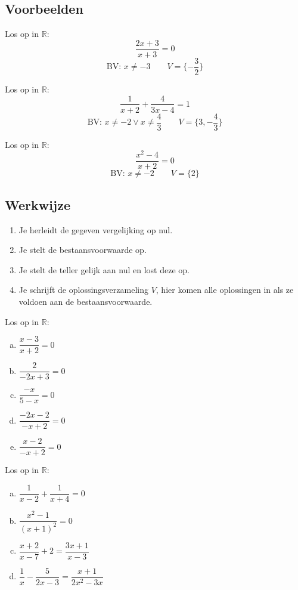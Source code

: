 \documentclass[12pt]{article}
\begin{document}
\subsection{Voorbeelden}

Los op in $\mathbb{R}$:
$$\frac{2x+3}{x+3} = 0$$
$$\mbox{BV: }x\neq -3 \qquad V=\{-\dfrac{3}{2}\}$$


Los op in $\mathbb{R}$:
$$\frac{1}{x+2}+\frac{4}{3x-4}=1$$
$$\mbox{BV: }x\neq -2 \vee x\neq \dfrac{4}{3} \qquad V=\{3,-\dfrac{4}{3}\}$$

Los op in $\mathbb{R}$:
$$\frac{x^2-4}{x+2}=0$$
$$\mbox{BV: }x\neq -2 \qquad V=\{2\}$$

\subsection{Werkwijze}
\begin{enumerate}[(1)]
  \item Je herleidt de gegeven vergelijking op nul.
  \item Je stelt de bestaansvoorwaarde op.
  \item Je stelt de teller gelijk aan nul en lost deze op.
  \item Je schrijft de oplossingsverzameling $V$, hier komen alle oplossingen in als ze voldoen aan de bestaansvoorwaarde.
\end{enumerate}

\begin{oefening}
Los op in $\mathbb{R}$:\\
\begin{enumerate}[(a)]
  \itemsep1em
  \item $\dfrac{x-3}{x+2}=0$
  \item $\dfrac{2}{-2x+3}=0$
  \item $\dfrac{-x}{5-x}=0$
  \item $\dfrac{-2x-2}{-x+2}=0$
  \item $\dfrac{x-2}{-x+2}=0$
\end{enumerate}
\end{oefening}

\begin{oefening}
Los op in $\mathbb{R}$:\\
\begin{enumerate}[(a)]
  \itemsep1em
  \item $\dfrac{1}{x-2}+\dfrac{1}{x+4}=0$
  \item $\dfrac{x^2-1}{(x+1)^2}=0$
  \item $\dfrac{x+2}{x-7}+2=\dfrac{3x+1}{x-3}$
  \item $\dfrac{1}{x}-\dfrac{5}{2x-3}=\dfrac{x+1}{2x^2-3x}$
\end{enumerate}
\end{oefening}
\end{document}

